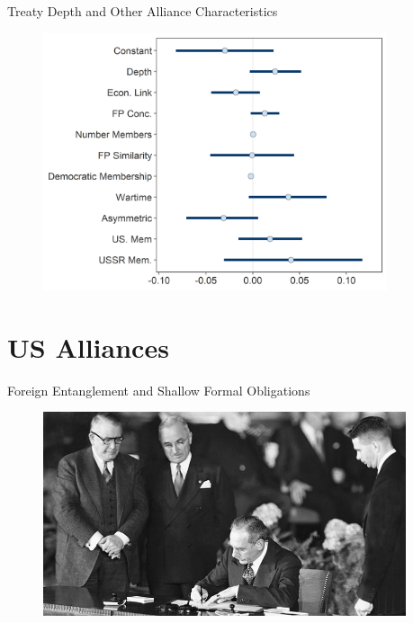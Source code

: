 \documentclass[12pt]{beamer}
\begin{document}

\begin{frame}{Treaty Depth and Other Alliance Characteristics}

\begin{figure}
	\centering
		\includegraphics[width=0.9\textwidth]{beta-intervals-min.png}
	\label{fig:beta-intervals-min}
\end{figure}


\end{frame}


\section{US Alliances}


\begin{frame}{Foreign Entanglement and Shallow Formal Obligations}

\begin{figure}
	\centering
		\includegraphics[width=0.95\textwidth]{acheson-nato-sign.jpg}
	\label{fig:acheson-nato-sign}
\end{figure}


\end{frame}
\end{document}
